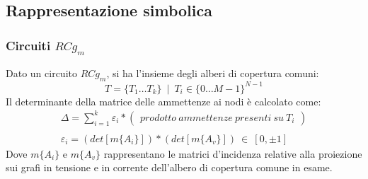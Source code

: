 \subsection{Rappresentazione simbolica}


\begin{frame}
 \frametitle{Circuiti $RCg_m$}

 Dato un circuito $RCg_m$, si ha l'insieme degli alberi di copertura comuni:
  $$ T = \{ T_1\ldots T_k \}~\mid~ T_i \in \{0\ldots M - 1\}^{N-1} $$
 Il determinante della matrice delle ammettenze ai nodi è calcolato come:
  $$
  \begin{array}{c}
  \Delta =
    \sum_{i = 1}^k{
      \varepsilon_i\ast\left(\begin{array}{c}
	prodotto~ammettenze~presenti~su~T_i
      \end{array}\right)
    }\\ \\
  \varepsilon_i = \left( det\left[ m\{ A_i \}\right]\right)\ast\left( det\left[ m\{ A_v\}\right]\right)~\in~\left[ 0,\pm 1\right]
  \end{array}
  $$
 Dove $m\{ A_i\}$ e $m\{ A_v\}$ rappresentano le matrici d'incidenza relative alla proiezione sui grafi in tensione e in corrente dell'albero di copertura comune in esame.

\end{frame}



